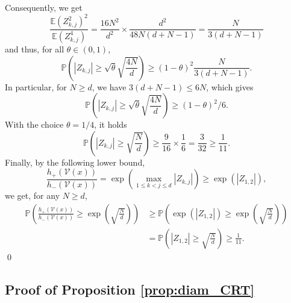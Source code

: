 \documentclass[paper=a4, fontsize=11pt]{scrartcl}
\newcommand{\PP}{\mathbb{P}}
\begin{document}
Consequently, we get
\[
\frac{\mathbb{E}(Z_{k,j}^2)^2}{\mathbb{E}(Z_{k,j}^4)} = \frac{16N^2}{d^2} \times \frac{d^2}{48N (d + N -1)} = \frac{N}{3(d + N -1)}
\]
and thus, for all \(\theta \in (0,1)\),
\[
\PP\left(|Z_{k,j}| \geq \sqrt{\theta} \sqrt{\frac{4N}{d}}\right) \geq (1-\theta)^2  \frac{N}{3(d + N -1)}.
\]
In particular, for \(N \geq d\), we have $3(d + N - 1) \leq 6N$, which gives
\[
\PP\left(|Z_{k,j}| \geq \sqrt{\theta} \sqrt{\frac{4N}{d}}\right) \geq (1-\theta)^2 / 6.
\]
With the choice \(\theta = 1/4\), it holds
\[
\PP\left(|Z_{k,j}| \geq \sqrt{\frac{N}{d}}\right) \geq \frac{9}{16} \times \frac{1}{6} = \frac{3}{32} \geq \frac{1}{11}.
\]
Finally, by the following lower bound,
\[
\frac{h_+(\mathcal V (x) )}{h_-(\mathcal V (x) )} = \exp \left( \max_{1\leq k < j \leq d } |Z_{k,j}| \right) \geq \exp (|Z_{1,2}|),
\]
we get, for any $N \geq d$, 
\begin{align*}
\PP\left(\frac{h_+(\mathcal V (x) )}{h_-(\mathcal V (x) )} 
\geq \exp\left(\sqrt{\frac{N}{d}}\right)\right) &\geq \PP\left(\exp(|Z_{1,2}|) \geq \exp\left(\sqrt{\frac{N}{d}}\right)\right) \\ 
&= \PP\left(|Z_{1,2}| \geq \sqrt{\frac{N}{d}}\right) \geq \frac{1}{11}.    
\end{align*} \qed

\subsection*{Proof of Proposition \ref{prop:diam_CRT}}
\end{document}
